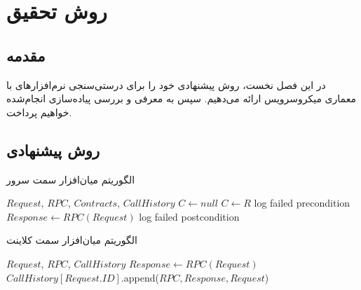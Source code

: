 \chapter{روش تحقیق}
\section{مقدمه} 
در این فصل نخست، روش پیشنهادی خود را برای درستی‌سنجی نرم‌افزارهای با معماری میکروسرویس ارائه می‌دهیم. سپس به معرفی و بررسی پیاده‌سازی انجام‌شده خواهیم پرداخت.

\section{روش پیشنهادی}

\begin{algorithm}[ht]
\onehalfspacing
\caption{الگوریتم میان‌افزار سمت سرور} \label{alg:serverMiddleware}
\begin{latin}
\begin{algorithmic}[1]

\REQUIRE $Request$, $RPC$, $Contracts$, $CallHistory$
\STATE $C \gets null$
        \STATE $C \gets R$
    \ENDIF
\ENDFOR
{}
            \STATE log failed precondition
        \ENDIF
    \ENDFOR
\ENDIF
\STATE $Response \gets RPC(Request)$
            \STATE log failed postcondition
        \ENDIF
    \ENDFOR
\ENDIF

\end{algorithmic}
\end{latin}
\end{algorithm}

\begin{algorithm}[ht]
\onehalfspacing
\caption{الگوریتم میان‌افزار سمت کلاینت} \label{alg:clientMiddleware}
\begin{latin}
\begin{algorithmic}[1]

\REQUIRE $Request$, $RPC$, $CallHistory$
\STATE $Response \gets RPC(Request)$
\STATE $CallHistory[Request.ID]$.append($RPC, Response, Request$)

\end{algorithmic}
\end{latin}
\end{algorithm}

